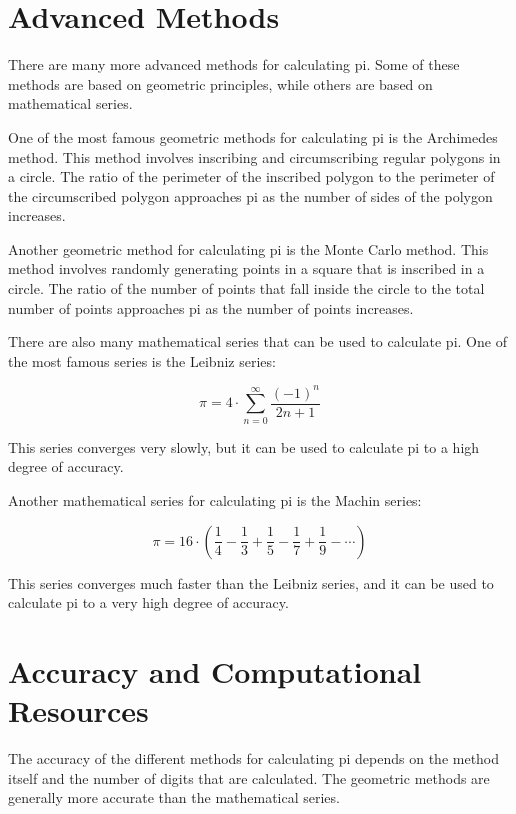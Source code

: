 \documentclass{article}
\begin{document}
\section{Advanced Methods}

There are many more advanced methods for calculating pi. Some of these methods are based on geometric principles, while others are based on mathematical series.

One of the most famous geometric methods for calculating pi is the Archimedes method. This method involves inscribing and circumscribing regular polygons in a circle. The ratio of the perimeter of the inscribed polygon to the perimeter of the circumscribed polygon approaches pi as the number of sides of the polygon increases.

Another geometric method for calculating pi is the Monte Carlo method. This method involves randomly generating points in a square that is inscribed in a circle. The ratio of the number of points that fall inside the circle to the total number of points approaches pi as the number of points increases.

There are also many mathematical series that can be used to calculate pi. One of the most famous series is the Leibniz series:

\begin{equation}
\pi = 4 \cdot \sum_{n = 0}^{\infty} \frac{(-1)^n}{2n + 1}
\end{equation}

This series converges very slowly, but it can be used to calculate pi to a high degree of accuracy.

Another mathematical series for calculating pi is the Machin series:

\begin{equation}
\pi = 16 \cdot \left( \frac{1}{4} - \frac{1}{3} + \frac{1}{5} - \frac{1}{7} + \frac{1}{9} - \cdots \right)
\end{equation}

This series converges much faster than the Leibniz series, and it can be used to calculate pi to a very high degree of accuracy.

\section{Accuracy and Computational Resources}

The accuracy of the different methods for calculating pi depends on the method itself and the number of digits that are calculated. The geometric methods are generally more accurate than the mathematical series.
\end{document}
